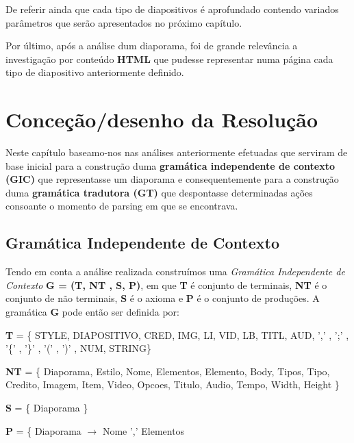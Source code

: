 \documentclass[11pt,a4paper]{report}
\begin{document}
De referir ainda que cada tipo de diapositivos é aprofundado contendo variados parâmetros que serão apresentados no próximo capítulo.

Por último, após a análise dum diaporama, foi de grande relevância a investigação por conteúdo \textbf{HTML} que pudesse representar numa página cada tipo de diapositivo anteriormente definido.

\chapter{Conceção/desenho da Resolução}
\label{chap:concecao}

Neste capítulo baseamo-nos nas análises anteriormente efetuadas que serviram de base inicial para a construção duma \textbf{gramática independente de contexto (GIC)} que representasse um diaporama e consequentemente para a construção duma \textbf{gramática tradutora (GT)} que despontasse determinadas ações consoante o momento de parsing em que se encontrava.


\section{Gramática Independente de Contexto}

Tendo em conta a análise realizada construímos uma \textit{Gramática Independente de Contexto} \textbf{G = (T, NT , S, P)}, em que \textbf{T} é conjunto de terminais, \textbf{NT} é o conjunto de não terminais, \textbf{S} é o axioma e \textbf{P} é o conjunto de produções. A gramática \textbf{G} pode então ser definida por:

\vspace{0.5cm}

\textbf{T} = \{ STYLE, DIAPOSITIVO, CRED, IMG, LI, VID, LB, TITL, AUD, ',' , ';' , '\{' , '\}' , '(' , ')' , NUM, STRING\}

\vspace{0.5cm}

\textbf{NT} = \{ Diaporama, Estilo, Nome, Elementos, Elemento, Body, Tipos, Tipo, Credito, Imagem, Item, Video, Opcoes, Titulo, Audio, Tempo, Width, Height \}

\vspace{0.5cm}

\textbf{S} = \{ Diaporama \}

\vspace{0.5cm}

\textbf{P} = \{ Diaporama $\rightarrow$ Nome ',' Elementos 
\end{document}
